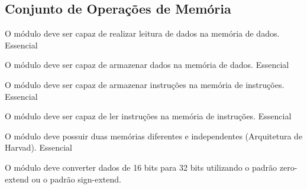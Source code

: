 \subsection{Conjunto de Operações de Memória}

	  \begin{functional}
		{O módulo deve ser capaz de realizar leitura de dados na memória de dados.}
		{Essencial}
		
		{O módulo deve ser capaz de armazenar dados na memória de dados.}
		{Essencial}

		{O módulo deve ser capaz de armazenar instruções na memória de instruções.}
		{Essencial}
		
		{O módulo deve ser capaz de ler instruções na memória de instruções.}
		{Essencial}
        
		 {O módulo deve possuir duas memórias diferentes e independentes (Arquitetura de Harvad).}
		 {Essencial}

		{O módulo deve converter dados de 16 bits para 32 bits utilizando o padrão zero-extend ou o padrão sign-extend.}

		 
	 \end{functional}